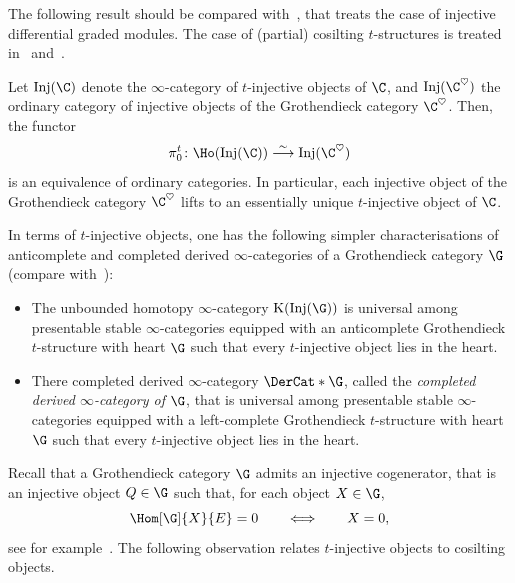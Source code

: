 \documentclass[a4paper]{amsart}
\begin{document}
The following result should be compared with~\cite[Theorem~0.2]{Sha18}, that
treats the case of injective differential graded modules. The case of (partial)
cosilting $t$-structures is treated in~\cite[Lemma~2.8]{AHMV17}
and~\cite[Lemma~5.5(2)]{Lak20}.

\begin{theorem}
  \label{thm:injectives-coasile}
  Let $\operatorname{Inj}(\C)$ denote the $\infty$-category of $t$-injective
  objects of $\C$, and $\operatorname{Inj}(\C^\heartsuit)$ the ordinary category
  of injective objects of the Grothendieck category $\C^\heartsuit$. Then, the
  functor
  \[
    \pi_0^t\colon\Ho(\operatorname{Inj}(\C))\stackrel{\sim}{\longrightarrow}\operatorname{Inj}(\C^\heartsuit)
  \]
  is an equivalence of ordinary categories. In particular, each injective object
  of the Grothendieck category $\C^\heartsuit$ lifts to an essentially unique
  $t$-injective object of $\C$.
\end{theorem}

\begin{remark}
  In terms of $t$-injective objects, one has the following simpler
  characterisations of anticomplete and completed derived $\infty$-categories of
  a Grothendieck category $\G$ (compare with~):
   \begin{itemize}
  \item \cite[Proposition~C.5.20 and~Theorem C.5.8.8]{Lur18SAG} The unbounded
    homotopy $\infty$-ca\-te\-go\-ry $\operatorname{K}(\operatorname{Inj}(\G))$ is
  universal among presentable stable $\infty$-categories equipped with an
  anticomplete Grothendieck
  $t$-structure with heart $\G$ such that every $t$-injective object lies in the heart.
\item \cite[Corollary~C.5.9.7]{Lur18SAG} There completed derived
  $\infty$-category $\DerCat*{\G}$, called the \emph{completed derived
    $\infty$-category of $\G$}, that is universal among presentable stable
  $\infty$-categories equipped with a left-complete Grothendieck $t$-structure
  with heart $\G$ such that every $t$-injective object lies in the heart.
  \end{itemize}
\end{remark}

Recall that a Grothendieck category $\G$ admits an injective cogenerator, that
is an injective object $Q\in\G$ such that, for each object $X\in\G$,
\[
  \Hom[\G]{X}{E}=0\qquad\Longleftrightarrow\qquad X=0,
\]
see for example~\cite[Theorem~9.6.3]{KS06}. The following observation relates
$t$-injective objects to cosilting objects.
\end{document}
